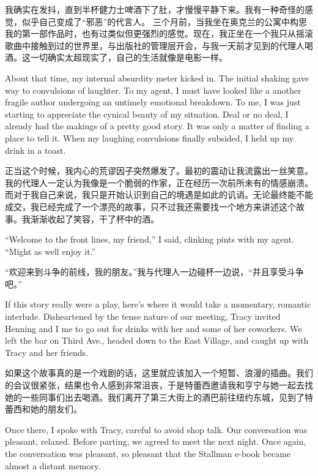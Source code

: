 \ifdefined\chs
我确实在发抖，直到半杯健力士啤酒下了肚，才慢慢平静下来。我有一种奇怪的感觉，似乎自己变成了``邪恶''的代言人。
\ifdefined\vtwo
\fi
三个月前，当我坐在奥克兰的公寓中构思我的第一部作品时，也有过类似但更强烈的感觉。现在，我正坐在一个我只从摇滚歌曲中接触到过的世界里，与出版社的管理层开会，与我一天前才见到的代理人喝酒。这一切确实太超现实了，自己的生活就像是电影一样。
\fi

\ifdefined\eng
About that time, my internal absurdity meter kicked in. The initial shaking gave way to convulsions of laughter. To my agent, I must have looked like a another fragile author undergoing an untimely emotional breakdown. To me, I was just starting to appreciate the cynical beauty of my situation. Deal or no deal, I already had the makings of a pretty good story. It was only a matter of finding a place to tell it. When my laughing convulsions finally subsided, I held up my drink in a toast.
\fi

\ifdefined\chs
正当这个时候，我内心的荒谬因子突然爆发了。最初的震动让我流露出一丝笑意。我的代理人一定认为我像是一个脆弱的作家，正在经历一次前所未有的情感崩溃。而对于我自己来说，我只是开始认识到自己的境遇是如此的讥诮。无论最终能不能成交，我已经完成了一个漂亮的故事，只不过我还需要找一个地方来讲述这个故事。我渐渐收起了笑容，干了杯中的酒。
\fi

\ifdefined\eng
``Welcome to the front lines, my friend,'' I said, clinking pints with my agent. ``Might as well enjoy it.''
\fi

\ifdefined\chs
``欢迎来到斗争的前线，我的朋友。''我与代理人一边碰杯一边说，``并且享受斗争吧。''
\fi

\ifdefined\eng
If this story really were a play, here's where it would take a momentary, romantic interlude. Disheartened by the tense nature of our meeting, Tracy invited Henning and \ifdefined\vone I \fi\ifdefined\vtwo me \fi to go out for drinks with her and some of her coworkers. We left the bar on Third Ave., headed down to the East Village, and caught up with Tracy and her friends.
\fi

\ifdefined\chs
如果这个故事真的是一个戏剧的话，这里就应该加入一个短暂、浪漫的插曲。我们的会议很紧张，结果也令人感到非常沮丧，于是特蕾西邀请我和亨宁与她一起去找她的一些同事们出去喝酒。我们离开了第三大街上的酒巴前往纽约东城，见到了特蕾西和她的朋友们。
\fi

\ifdefined\eng
Once there, I spoke with Tracy, careful to avoid shop talk. Our conversation was pleasant, relaxed. Before parting, we agreed to meet the next night. Once again, the conversation was pleasant, so pleasant that the Stallman e-book became almost a distant memory.
\fi

